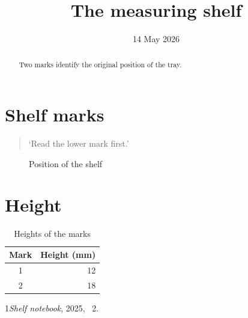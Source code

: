 \documentclass{article}
\begin{document}
\title{The measuring shelf}\author{}\date{14 May 2026}\maketitle
\begin{abstract}Two marks identify the original position of the tray.\end{abstract}
\tableofcontents
\section{Shelf marks}\begin{quote}‘Read the lower mark first.’\end{quote}
\begin{figure}[ht]\centering\fbox{\rule{0pt}{8mm}\rule{33mm}{0pt}}\caption{Position of the shelf}\end{figure}
\section{Height}
\begin{table}[ht]\centering\begin{tabular}{cr}Mark&Height (mm)\\\hline 1&12\\2&18\end{tabular}\caption{Heights of the marks}\end{table}
\begin{thebibliography}{1}\emph{Shelf notebook}, 2025, \chaptername~2.\end{thebibliography}
\end{document}
